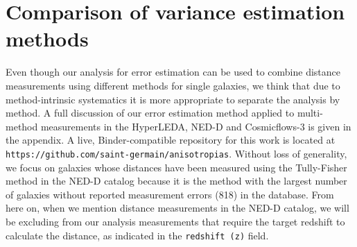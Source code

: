 \documentclass[a4paper,fleqn,usenatbib]{mnras}
\begin{document}
\section{Comparison of variance estimation methods}
\label{sec:comp} 


Even though our analysis for error estimation can be used to combine distance measurements using different methods for single galaxies, we think that due to method-intrinsic systematics it is more appropriate to separate the analysis by method. A full discussion of our error estimation method applied to multi-method measurements in the HyperLEDA, NED-D and Cosmicflows-3 is given in the appendix. A live, Binder-compatible repository for this work is located at \texttt{https://github.com/saint-germain/anisotropias}. Without loss of generality, we focus on galaxies whose distances have been measured using the Tully-Fisher method in the NED-D catalog because it is the method with the largest number of galaxies without reported measurement errors (818) in the database. From here on, when we mention distance measurements in the NED-D catalog, we will be excluding from our analysis measurements that require the target redshift to calculate the distance, as indicated in the \texttt{redshift (z)} field. \\
\end{document}
